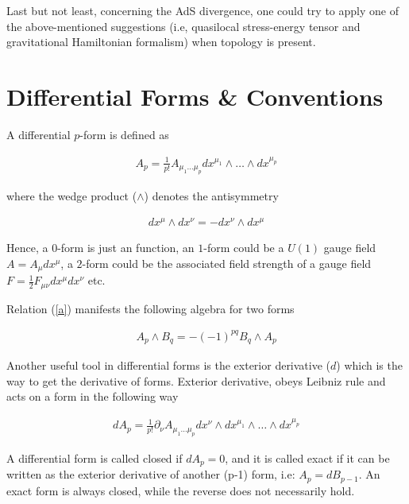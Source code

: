 \documentclass[a4paper,notitlepage]{report}
\begin{document}
Last but not least, concerning the AdS divergence, one could try to apply one of the above-mentioned suggestions (i.e, quasilocal stress-energy tensor and gravitational Hamiltonian formalism) when topology is present.

\appendix
\chapter{Differential Forms \& Conventions} \label{AB}

A differential $p$-form is defined as

\begin{align}
A_p = \frac{1}{p!} A_{\mu_{1} \ldots \mu_{p}} dx^{\mu_{1}} \wedge \ldots \wedge dx^{\mu_{p}}
\end{align}

\vspace{0.5em}
where the wedge product ($\wedge$) denotes the antisymmetry

\begin{align} \label{a}
dx^{\mu} \wedge dx^{\nu} = - dx^{\nu} \wedge dx^{\mu}
\end{align}

\vspace{0.5em}
Hence, a $0$-form is just an function, an $1$-form could be a $U(1)$ gauge field $A = A_\mu dx^\mu$, a $2$-form could be the associated field strength of a gauge field $F=\frac{1}{2} F_{\mu\nu} dx^\mu dx^\nu$ etc.

Relation (\ref{a}) manifests the following algebra for two forms

\begin{align} \label{a}
A_p \wedge B_q = - (-1)^{pq} B_q \wedge A_p
\end{align}

\vspace{0.5em}
Another useful tool in differential forms is the exterior derivative ($d$) which is the way to get the derivative of forms. Exterior derivative, obeys Leibniz rule and acts on a form in the following way

\begin{align}
dA_p = \frac{1}{p!} \partial_{\nu }A_{\mu_{1} \ldots \mu_{p}} dx^{\nu} \wedge dx^{\mu_{1}} \wedge \ldots \wedge dx^{\mu_{p}}
\end{align}

\vspace{0.5em}
A differential form is called closed if $dA_p = 0$, and it is called exact if it can be written as the exterior derivative of another (p-1) form, i.e: $A_p = dB_{p-1}$. An exact form is always closed, while the reverse does not necessarily hold.  
\end{document}
